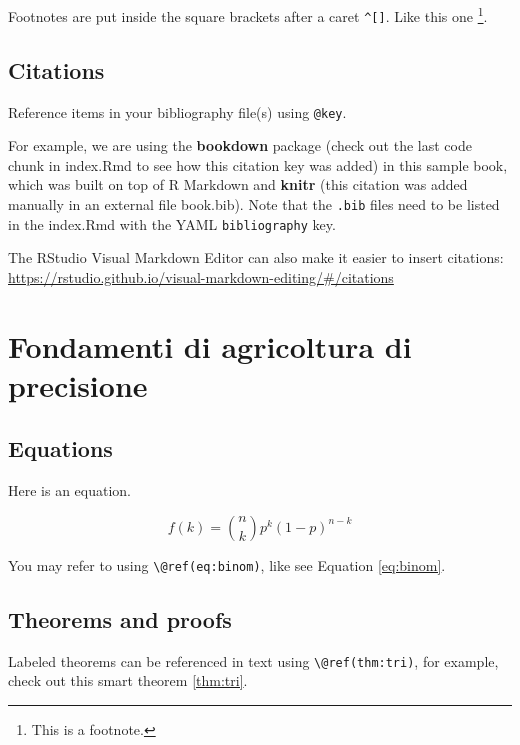 \documentclass[
]{book}
\theoremstyle{definition}
\theoremstyle{definition}
\theoremstyle{definition}
\theoremstyle{definition}
\theoremstyle{remark}
\begin{document}
Footnotes are put inside the square brackets after a caret \texttt{\^{}{[}{]}}. Like this one \footnote{This is a footnote.}.

\hypertarget{citations}{%
\section{Citations}\label{citations}}

Reference items in your bibliography file(s) using \texttt{@key}.

For example, we are using the \textbf{bookdown} package \citep{R-bookdown} (check out the last code chunk in index.Rmd to see how this citation key was added) in this sample book, which was built on top of R Markdown and \textbf{knitr} \citep{xie2015} (this citation was added manually in an external file book.bib). Note that the \texttt{.bib} files need to be listed in the index.Rmd with the YAML \texttt{bibliography} key.

The RStudio Visual Markdown Editor can also make it easier to insert citations: \url{https://rstudio.github.io/visual-markdown-editing/\#/citations}

\hypertarget{fondamenti-di-agricoltura-di-precisione}{%
\chapter{Fondamenti di agricoltura di precisione}\label{fondamenti-di-agricoltura-di-precisione}}

\hypertarget{equations}{%
\section{Equations}\label{equations}}

Here is an equation.

\begin{equation} 
  f\left(k\right) = \binom{n}{k} p^k\left(1-p\right)^{n-k}
  \label{eq:binom}
\end{equation}

You may refer to using \texttt{\textbackslash{}@ref(eq:binom)}, like see Equation \eqref{eq:binom}.

\hypertarget{theorems-and-proofs}{%
\section{Theorems and proofs}\label{theorems-and-proofs}}

Labeled theorems can be referenced in text using \texttt{\textbackslash{}@ref(thm:tri)}, for example, check out this smart theorem \ref{thm:tri}.
\end{document}
